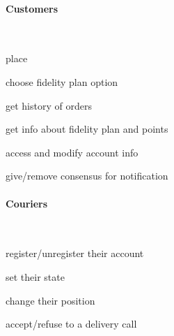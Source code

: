 \paragraph*{Customers}~\vspace{0.3\baselineskip}
\begin{itemize}
  \begin{minipage}{0.47\linewidth}
    \item place \Order
    \item choose fidelity plan option
    \item get history of orders
  \end{minipage}
  \begin{minipage}{0.53\linewidth}
    \item get info about fidelity plan and points
    \item access and modify account info
    \item give/remove consensus for notification
  \end{minipage}
\end{itemize}

\paragraph*{Couriers}~\vspace{0.3\baselineskip}
\begin{itemize}
  \begin{minipage}{0.47\linewidth}
    \item register/unregister their account
    \item set their state
  \end{minipage}
  \begin{minipage}{0.53\linewidth}
    \item change their position
    \item accept/refuse to a delivery call
  \end{minipage}
\end{itemize}


